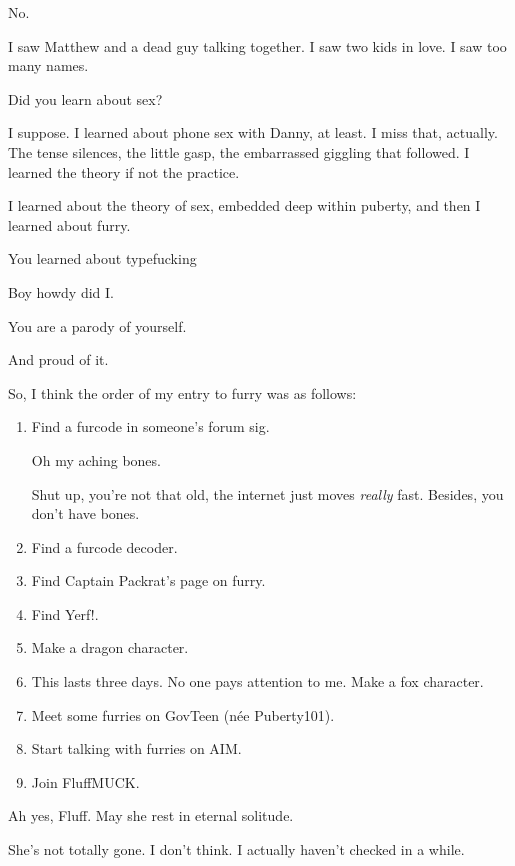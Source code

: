 \begin{paracol}{2}
\begin{leftcolumn}
No.

I saw Matthew and a dead guy talking together. I saw two kids in love. I saw too many names.

\begin{ally}
Did you learn about sex?
\end{ally}
I suppose. I learned about phone sex with Danny, at least. I miss that, actually. The tense silences, the little gasp, the embarrassed giggling that followed. I learned the theory if not the practice.

I learned about the theory of sex, embedded deep within puberty, and then I learned about furry.

\begin{ally}
You learned about typefucking
\end{ally}
Boy howdy did I.

\begin{ally}
You are a parody of yourself.
\end{ally}
And proud of it.
\newpage

\noindent So, I think the order of my entry to furry was as follows:

\begin{enumerate}
\def\labelenumi{\arabic{enumi}.}
\item
  Find a furcode in someone's forum sig.

  \begin{ally}
  Oh my aching bones.
  \end{ally}
  Shut up, you're not that old, the internet just moves \emph{really} fast. Besides, you don't have bones.
\item
  Find a furcode decoder.
\item
  Find Captain Packrat's page on furry.
\item
  Find Yerf!.
\item
  Make a dragon character.
\item
  This lasts three days. No one pays attention to me. Make a fox character.
\item
  Meet some furries on GovTeen (née Puberty101).
\item
  Start talking with furries on AIM.
\item
  Join FluffMUCK.
\end{enumerate}

\begin{ally}
Ah yes, Fluff. May she rest in eternal solitude.
\end{ally}
She's not totally gone. I don't think. I actually haven't checked in a while.


\end{leftcolumn}
\end{paracol}
